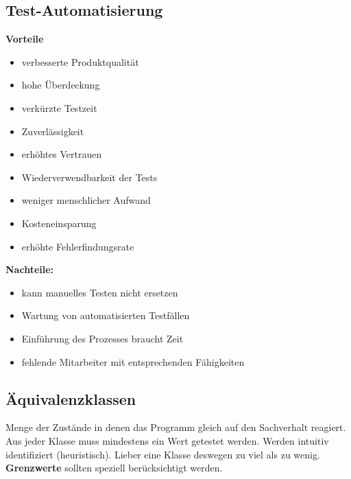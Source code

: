 \documentclass{book}
\begin{document}
    \subsection{Test-Automatisierung}
    \textbf{Vorteile}
    \begin{itemize}
        \item verbesserte Produktqualität
        \item hohe Überdeckung
        \item verkürzte Testzeit
        \item Zuverlässigkeit
        \item erhöhtes Vertrauen
        \item Wiederverwendbarkeit der Tests
        \item weniger menschlicher Aufwand
        \item Kosteneinsparung
        \item erhöhte Fehlerfindungsrate
    \end{itemize}
    \textbf{Nachteile:}
    \begin{itemize}
        \item kann manuelles Testen nicht ersetzen
        \item Wartung von automatisierten Testfällen
        \item Einführung des Prozesses braucht Zeit
        \item fehlende Mitarbeiter mit entsprechenden Fähigkeiten
    \end{itemize}
    \subsection{Äquivalenzklassen}
    Menge der Zustände in denen das Programm gleich auf den Sachverhalt reagiert.
    Aus jeder Klasse muss mindestens ein Wert getestet werden.
    Werden intuitiv identifiziert (heuristisch).
    \newline Lieber eine Klasse deswegen zu viel als zu wenig.
    \newline
    \textbf{Grenzwerte} sollten speziell berücksichtigt werden.
\end{document}

